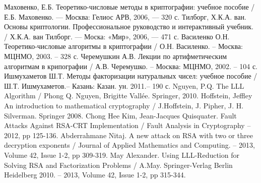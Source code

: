 \newpage
{}
\begin{thebibliography}{}	
	  Маховенко, Е.Б. Теоретико-числовые методы в криптографии: учебное пособие / Е.Б. Маховенко. — Москва: Гелиос АРВ, 2006, — 320 с.
	  Тилборг, Х.К.А. ван. Основы криптологии. Профессиональное руководство и интерактивный учебник. / Х.К.А. ван Тилборг. — Моска: «Мир», 2006,
	  — 471 с.
	  Василенко О.Н. Теоретико-числовые алгоритмы в криптографии / О.Н. Василенко. – Москва: МЦНМО, 2003. – 328 с.
	  Черемушкин А.В. Лекции по артифметическим алгоритмам в крипографии / А.В. Черемушко. – Москва: МЦНМО, 2002. – 104 с.
	  Ишмухаметов Ш.Т. Методы факторизации натуральных чисел: учебное пособие / Ш.Т. Ишмухаметов.– Казань: Казан. ун. 2011.– 190 с.
	  Nguyen, P.Q. The LLL Algorithm / Phong Q. Nguyen, Brigitte Vallée. Springer, 2010.
	  Hoffstein, Jeffley An introduction to mathematical cryptography / J.Hoffstein, J. Pipher, J. H. Silverman. Springer 2008.
	  Chong Hee Kim, Jean-Jacques Quisquater. Fault Attacks Against RSA-CRT Implementation / Fault Analysis in Cryptography – 2012, pp 125-136.
	  Abderrahmane Nitaj. A new attack on RSA with two or three decryption exponents / Journal of Applied Mathematics and Computing. –
	  2013, Volume 42, Issue 1-2, pp 309-319.	
	  May Alexander. Using LLL-Reduction for Solving RSA and Factorization Problems / A.May. Springer-Verlag Berlin Heidelberg 2010. –
	  2013, Volume 42, Issue 1-2, pp 315-344.	
\end{thebibliography}